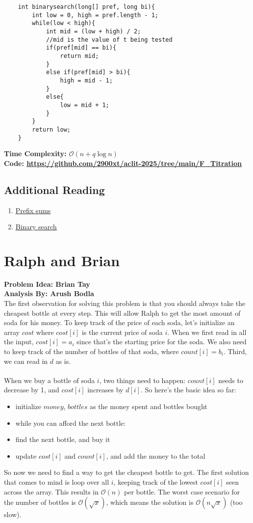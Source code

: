 \documentclass{article}
\newcommand{\link}[1]{\textcolor{blue!50!black}{\uline{\url{#1}}}}
\newcommand{\namelink}[2]{\textcolor{blue!50!black}{\uline{\href{#1}{#2}}}}
\begin{document}
\begin{lstlisting}
    int binarysearch(long[] pref, long bi){
        int low = 0, high = pref.length - 1;
        while(low < high){
            int mid = (low + high) / 2;
            //mid is the value of t being tested
            if(pref[mid] == bi){
                return mid;
            }
            else if(pref[mid] > bi){
                high = mid - 1;
            }
            else{
                low = mid + 1;
            }
        }
        return low;
    }
\end{lstlisting}
\textbf{Time Complexity: $\mathcal{O}(n + q\log n)$}\\
\textbf{Code: \link{https://github.com/2900xt/aclit-2025/tree/main/F_Titration}}
\subsection{Additional Reading}
\begin{enumerate}
    \item \namelink{https://usaco.guide/silver/prefix-sums}{Prefix sums}
    \item \namelink{https://usaco.guide/silver/binary-search}{Binary search}
\end{enumerate}
\newpage


\section{Ralph and Brian}
\textbf{Problem Idea: Brian Tay}\\
\textbf{Analysis By: Arush Bodla}\\
The first observation for solving this problem is that you should always take the cheapest bottle at every step. This will allow Ralph to get the most amount of soda for his money. To keep track of the price of each soda, let's initialize an array $cost$ where $cost[i]$ is the current price of soda $i$. When we first read in all the input, $cost[i] = a_i$ since that's the starting price for the soda. We also need to keep track of the number of bottles of that soda, where $count[i] = b_i$. Third, we can read in $d$ as is.\\\\
When we buy a bottle of soda $i$, two things need to happen: $count[i]$ needs to decrease by 1, and $cost[i]$ increases by $d[i]$. So here's the basic idea so far: 
\begin{itemize}
    \item initialize $money$, $bottles$ as the money spent and bottles bought
    \item while you can afford the next bottle:
    \item find the next bottle, and buy it
    \item update $cost[i]$ and $count[i]$, and add the money to the total
\end{itemize}
So now we need to find a way to get the cheapest bottle to get. The first solution that comes to mind is loop over all $i$, keeping track of the lowest $cost[i]$ seen across the array. This results in $\mathcal{O}(n)$ per bottle. The worst case scenario for the number of bottles is $\mathcal{O}(\sqrt{x})$, which means the solution is $\mathcal{O}(n\sqrt{x})$ (too slow).
\end{document}
